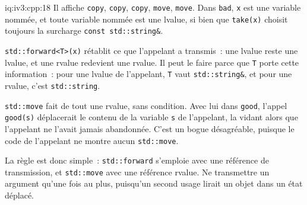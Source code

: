 \begin{solution}{iq:iv3:cpp:18}
Il affiche \texttt{copy}, \texttt{copy}, \texttt{copy}, \texttt{move}, \texttt{move}. Dans \texttt{bad}, \texttt{x} est une variable nommée, et toute variable nommée est une lvalue, si bien que \texttt{take(x)} choisit toujours la surcharge \texttt{const std::string\&}.

\texttt{std::forward<T>(x)} rétablit ce que l'appelant a transmis~: une lvalue reste une lvalue, et une rvalue redevient une rvalue. Il peut le faire parce que \texttt{T} porte cette information~: pour une lvalue de l'appelant, \texttt{T} vaut \texttt{std::string\&}, et pour une rvalue, c'est \texttt{std::string}.

\texttt{std::move} fait de tout une rvalue, sans condition. Avec lui dans \texttt{good}, l'appel \texttt{good(s)} déplacerait le contenu de la variable \texttt{s} de l'appelant, la vidant alors que l'appelant ne l'avait jamais abandonnée. C'est un bogue désagréable, puisque le code de l'appelant ne montre aucun \texttt{std::move}.

La règle est donc simple~: \texttt{std::forward} s'emploie avec une référence de transmission, et \texttt{std::move} avec une référence rvalue. Ne transmettre un argument qu'une fois au plus, puisqu'un second usage lirait un objet dans un état déplacé.

\end{solution}

